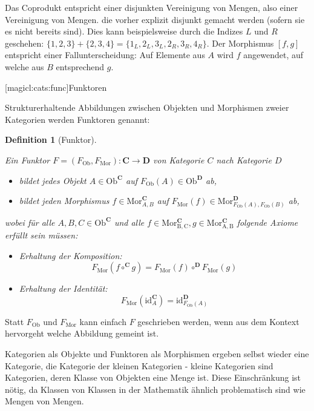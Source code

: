\documentclass[a4paper, bibgerm]{book}
\newcommand\lsubsection{}
\newtheorem{defini}{Definition}
\newcommand{\defi}[2]{%
  \begin{defini}[#1]
    \label{def:#1}
    #2
  \end{defini}
}
\begin{document}
Das Coprodukt entspricht einer disjunkten Vereinigung von Mengen, also
einer Vereinigung von Mengen. die vorher explizit disjunkt gemacht
werden (sofern sie es nicht bereits sind). Dies kann beispielsweise durch
die Indizes $L$ und $R$ geschehen: $\{1,2,3\} + \{2,3,4\} =
\{1_L,2_L,3_L,2_R,3_R,4_R\}$. Der Morphismus $[f,g]$ entspricht einer
Fallunterscheidung: Auf Elemente aus $A$ wird $f$ angewendet, auf welche
aus $B$ entsprechend $g$.

\lsubsection[magicl:cats:func]{Funktoren}

Strukturerhaltende Abbildungen zwischen Objekten und Morphismen zweier
Kategorien werden Funktoren genannt:

\defi{Funktor}{
Ein Funktor $F=(F_{\mathrm{Ob}},F_{\mathrm{Mor}}) : \mathbf{C}
\rightarrow \mathbf{D}$ von Kategorie $C$ nach Kategorie $D$
    \begin{itemize}
    \item bildet jedes Objekt $A \in \mathrm{Ob}^{\mathbf{C}}$ auf $F_{\mathrm{Ob}}(A) \in
      \mathrm{Ob}^{\mathbf{D}}$ ab,
    \item bildet jeden Morphismus $f \in
      \mathrm{Mor}^{\mathbf{C}}_{A,B}$ auf $F_{\mathrm{Mor}}(f) \in
      \mathrm{Mor}^{\mathbf{D}}_{F_{\mathrm{Ob}}(A),F_{\mathrm{Ob}}(B)}$
      ab,
    \end{itemize}
    wobei für alle $A,B,C \in \mathrm{Ob}^{\mathbf{C}}$ und alle $f \in
    \mathrm{Mor^{\mathbf{C}}_{B,C}},g \in
    \mathrm{Mor^{\mathbf{C}}_{A,B}}$ folgende Axiome erfüllt sein
    müssen:
    \begin{itemize}
    \item Erhaltung der Komposition:
      $$F_{\mathrm{Mor}}(f \circ^{\mathbf{C}} g) =
      F_{\mathrm{Mor}}(f) \circ^{\mathbf{D}} F_{\mathrm{Mor}}(g)$$
    \item Erhaltung der Identität:
      $$F_{\mathrm{Mor}}(\mathrm{id}^{\mathbf{C}}_A) =
      \mathrm{id}^{\mathbf{D}}_{F_{\mathrm{Ob}}(A)}$$
    \end{itemize}
}

Statt $F_{\mathrm{Ob}}$ und $F_{\mathrm{Mor}}$ kann einfach $F$
geschrieben werden, wenn aus dem Kontext hervorgeht welche Abbildung
gemeint ist.

Kategorien als Objekte und Funktoren als Morphismen ergeben selbst
wieder eine Kategorie, die Kategorie der kleinen Kategorien - kleine
Kategorien sind Kategorien, deren Klasse von Objekten eine Menge
ist. Diese Einschränkung ist nötig, da Klassen von Klassen in der
Mathematik ähnlich problematisch sind wie Mengen von Mengen.
\end{document}
